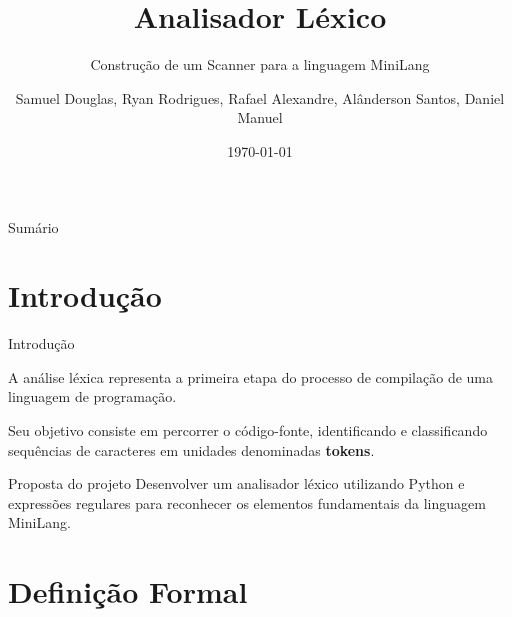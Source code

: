 \documentclass[aspectratio=169, 11pt]{beamer}
\title{Analisador Léxico}
\subtitle{Construção de um Scanner para a linguagem MiniLang}
\author{Samuel Douglas, Ryan Rodrigues, Rafael Alexandre, Alânderson Santos, Daniel Manuel }
\institute{Ciência da Computação}
\date{\today}
\begin{document}
\begin{frame}
    \titlepage
\end{frame}

\begin{frame}{Sumário}
    \tableofcontents
\end{frame}

\section{Introdução}

\begin{frame}{Introdução}

    A análise léxica representa a primeira etapa do
    processo de compilação de uma linguagem de programação.

    \vspace{0.4cm}

    Seu objetivo consiste em percorrer o código-fonte,
    identificando e classificando sequências de caracteres
    em unidades denominadas \textbf{tokens}.

    \vspace{0.4cm}

    \begin{block}{Proposta do projeto}
        Desenvolver um analisador léxico utilizando Python
        e expressões regulares para reconhecer os elementos
        fundamentais da linguagem MiniLang.
    \end{block}

\end{frame}

\section{Definição Formal}
\end{document}

